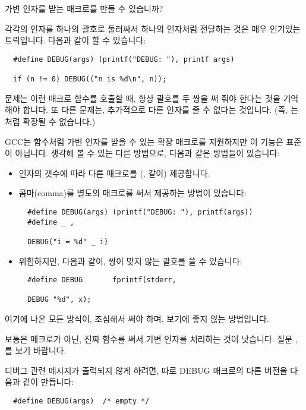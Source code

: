 \begin{faq}
	가변 인자를 받는 매크로를 만들 수 있습니까?

\A
	각각의 인자를 하나의 괄호로 둘러싸서 하나의 인자처럼 전달하는 것은
	매우 인기있는 트릭입니다.  다음과 같이 할 수 있습니다:
\begin{verbatim}
  #define DEBUG(args) (printf("DEBUG: "), printf args)

  if (n != 0) DEBUG(("n is %d\n", n));
\end{verbatim}
	문제는 이런 매크로 함수를 호출할 때, 항상 괄호를 두 쌍을 써 줘야
	한다는 것을 기억해야 합니다. 또 다른 문제는, 추가적으로 다른
        인자를 줄 수 없다는 것입니다. (즉, 는
        처럼 확장될 수 없습니다.)

	GCC는 함수처럼 가변 인자를 받을 수 있는 확장 매크로를 지원하지만
	이 기능은 표준이 아닙니다.  생각해 볼 수 있는 다른 방법으로, 
        다음과 같은 방법들이 있습니다:
        \begin{itemize}
          \item 인자의 갯수에 따라
	    다른 매크로를 (,  같이) 제공합니다.
          \item 콤마(comma)를 별도의 매크로를 써서 제공하는
	    방법이 있습니다:
\begin{verbatim}
  #define DEBUG(args) (printf("DEBUG: "), printf(args))
  #define _ ,

  DEBUG("i = %d" _ i)
\end{verbatim}
          \item 위험하지만, 다음과 같이, 쌍이 맞지 않는 괄호를 쓸 수 있습니다:
\begin{verbatim}
  #define DEBUG       fprintf(stderr,

  DEBUG "%d", x);
\end{verbatim}
        \end{itemize}
        \noindent 여기에 나온 모든 방식이, 조심해서 써야 하며, 보기에
        좋지 않는 방법입니다.

        보통은 매크로가 아닌, 진짜 함수를 써서 가변 인자를 처리하는 것이
        낫습니다. 질문 , 를 보기 바랍니다.

	디버그 관련 메시지가 출력되지 않게 하려면, 따로 DEBUG 매크로의 다른
        버전을 다음과 같이 만듭니다:
\begin{verbatim}
  #define DEBUG(args)  /* empty */
\end{verbatim}


\end{faq}
